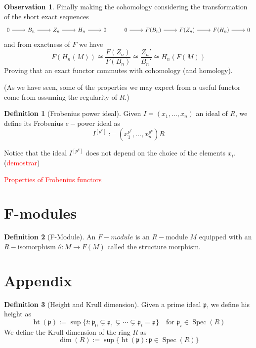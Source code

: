 \documentclass[leqno]{article}
\theoremstyle{definition}
\newtheorem{definition}{Definition}[section]
\newtheorem{observation}{Observation}[section]
\DeclareMathOperator{\heigth}{ht}
\DeclareMathOperator{\Spec}{Spec}
\newcommand{\com}[1]{\textcolor{red}{#1}}
\begin{document}
\begin{observation}
Finally making the cohomology considering the transformation of the short exact sequences
\[\begin{tikzcd}
	0 & {B_n} & {Z_n} & {H_n} & 0 & 0 & {F(B_n)} & {F(Z_n)} & {F(H_n)} & 0
	\arrow[from=1-1, to=1-2]
	\arrow[from=1-2, to=1-3]
	\arrow[from=1-3, to=1-4]
	\arrow[from=1-4, to=1-5]
	\arrow[from=1-6, to=1-7]
	\arrow[from=1-7, to=1-8]
	\arrow[from=1-8, to=1-9]
	\arrow[from=1-9, to=1-10]
\end{tikzcd}\]
and from exactness of $F$ we have
\[
F(H_n(M)) \cong  \frac{F(Z_n)}{F(B_n)} \cong  \frac{Z_n'}{B_n'} \cong H_n(F(M))
\] 
Proving that an exact functor commutes with cohomology (and homology).
\end{observation}

(As we have seen, some of the properties we may expect from a useful functor come from assuming the regularity of $R$.)

\begin{definition}[Frobenius power ideal] Given  $I = (x_1, \ldots, x_n)$ an ideal of $R$, we define its Frobenius $e-$power ideal as
   \[
	 I ^{[p^e]} := (x_1^{p^e}, \ldots, x_n ^{p^e})R
  \] 
\end{definition}
Notice that the ideal $I ^{[p^e]}$ does not depend on the choice of the elements $x_i$. (\com{demostrar})



\com{Properties of Frobenius functors}

\section{F-modules}

\begin{definition}[F-Module] An $F-module$ is an $R-$module $M$ equipped with an $R-$isomorphism  $\theta:M \to F(M)$ called the structure morphism.
\end{definition}



\section{Appendix}

\begin{definition}[Height and Krull dimension] Given a prime ideal $\mathfrak{p}$, we define his height as
  \[
	\heigth (\mathfrak{p}) := \sup \{t: \mathfrak{p}_0 \subsetneq \mathfrak{p}_1 \subsetneq \cdots \subsetneq  \mathfrak{p}_t = \mathfrak{p} \} \quad \text{for } \mathfrak{p}_i\in \Spec(R)
  \]
We define the Krull dimension of the ring $R$ as
 \[
 \dim (R) :=  \sup \{\heigth (\mathfrak{p}) : \mathfrak{p}\in \Spec(R)\}
\] 
\end{definition}
\end{document}
